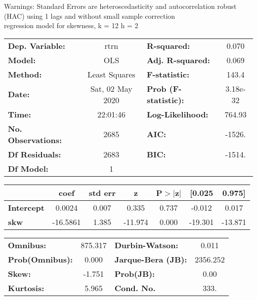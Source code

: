 Warnings: \newline
 [1] Standard Errors are heteroscedasticity and autocorrelation robust (HAC) using 1 lags and without small sample correction\\ 

regression model for skewness, k = 12 h = 2\begin{center}
\begin{tabular}{lclc}
\toprule
\textbf{Dep. Variable:}    &       rtrn       & \textbf{  R-squared:         } &     0.070   \\
\textbf{Model:}            &       OLS        & \textbf{  Adj. R-squared:    } &     0.069   \\
\textbf{Method:}           &  Least Squares   & \textbf{  F-statistic:       } &     143.4   \\
\textbf{Date:}             & Sat, 02 May 2020 & \textbf{  Prob (F-statistic):} &  3.18e-32   \\
\textbf{Time:}             &     22:01:46     & \textbf{  Log-Likelihood:    } &    764.93   \\
\textbf{No. Observations:} &        2685      & \textbf{  AIC:               } &    -1526.   \\
\textbf{Df Residuals:}     &        2683      & \textbf{  BIC:               } &    -1514.   \\
\textbf{Df Model:}         &           1      & \textbf{                     } &             \\
\bottomrule
\end{tabular}
\begin{tabular}{lcccccc}
                   & \textbf{coef} & \textbf{std err} & \textbf{z} & \textbf{P$> |$z$|$} & \textbf{[0.025} & \textbf{0.975]}  \\
\midrule
\textbf{Intercept} &       0.0024  &        0.007     &     0.335  &         0.737        &       -0.012    &        0.017     \\
\textbf{skw}       &     -16.5861  &        1.385     &   -11.974  &         0.000        &      -19.301    &      -13.871     \\
\bottomrule
\end{tabular}
\begin{tabular}{lclc}
\textbf{Omnibus:}       & 875.317 & \textbf{  Durbin-Watson:     } &    0.011  \\
\textbf{Prob(Omnibus):} &   0.000 & \textbf{  Jarque-Bera (JB):  } & 2356.252  \\
\textbf{Skew:}          &  -1.751 & \textbf{  Prob(JB):          } &     0.00  \\
\textbf{Kurtosis:}      &   5.965 & \textbf{  Cond. No.          } &     333.  \\
\bottomrule
\end{tabular}
\end{center}

